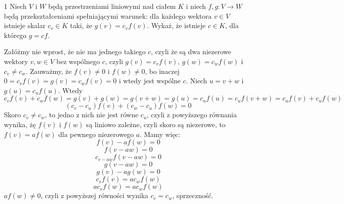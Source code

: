 \documentclass{../note}
\begin{document}
\begin{zadanie}{1}
Niech $V$ i $W$ będą przestrzeniami liniowymi nad ciałem $K$ i niech $f,g:V\rightarrow W$ będą przekształceniami spełniającymi warunek: dla każdego wektora $v\in V$ istnieje skalar $c_{v}\in K$ taki, że $g(v)=c_{v}f(v)$. Wykaż, że istnieje $c\in K$, dla którego $g=cf$.
\end{zadanie}
\begin{rozwiazanie}
Załóżmy nie wprost, że nie ma jednego takiego $c$, czyli że są dwa niezerowe wektory $v, w \in V$ bez wspólnego $c$, czyli $g(v) = c_vf(v)$, $g(w) = c_wf(w)$ i $c_v \neq c_w$. Zauważmy, że $f(v) \neq 0$ i $f(w) \neq 0$, bo inaczej $0 = c_vf(v) = g(v) = c_wf(v) = 0$ i wtedy jest wspólne $c$. Niech $u = v + w$ i $g(u) = c_uf(u)$. Wtedy
\[c_vf(v) + c_wf(w) = g(v) + g(w) = g(v + w) = g(u) = c_uf(u) = c_uf(v + w) = c_uf(v) + c_uf(w)\]
\[(c_v - c_u)f(v) + (c_w - c_u)f(w) = 0\]
Skoro $c_v \neq c_w$, to jedno z nich nie jest równe $c_u$, czyli z powyższego równania wynika, żę $f(v)$ i $f(w)$ są liniowo zależne, czyli skoro są niezerowe, to $f(v) = af(w)$ dla pewnego niezerowego $a$. Mamy więc:
\[f(v) - af(w) = 0\]
\[f(v - aw) = 0\]
\[c_{v - aw}f(v - aw) = 0\]
\[g(v - aw) = 0\]
\[g(v) - ag(w) = 0\]
\[c_vf(v) = ac_wf(w)\]
\[ac_vf(w) = ac_wf(w)\]
$af(w) \neq 0$, czyli z powyższej równości wynika $c_v = c_w$, sprzeczność.
\end{rozwiazanie}
\end{document}

